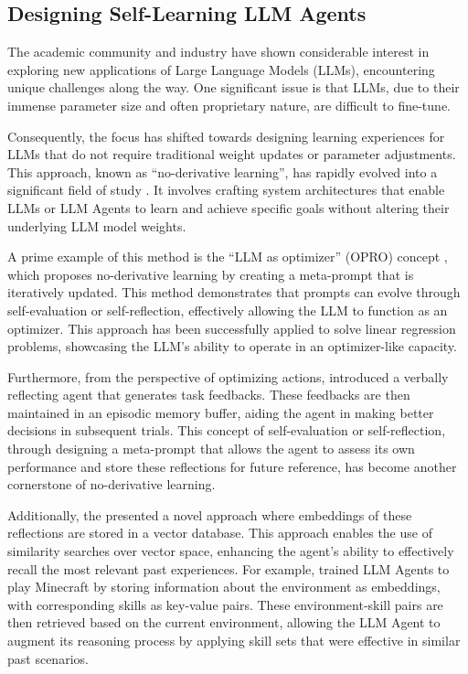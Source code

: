 \documentclass[15pt,letterpaper]{article}
\begin{document}
\subsection{Designing Self-Learning LLM Agents}\label{llm-agent-lit}

The academic community and industry have shown considerable interest 
in exploring new applications of Large Language Models (LLMs), 
encountering unique challenges along the way. 
One significant issue is that LLMs, due to their immense parameter size 
and often proprietary nature, are difficult to fine-tune. 

Consequently, the focus has shifted towards designing learning experiences 
for LLMs that do not require traditional weight updates or parameter adjustments. 
This approach, known as ``no-derivative learning'', 
has rapidly evolved into a significant field of study \citep{yang2023large, zhu2023ghost, wang2023voyager}. 
It involves crafting system architectures that enable LLMs or LLM Agents to learn and achieve specific goals without altering their underlying LLM model weights.

A prime example of this method is the ``LLM as optimizer'' (OPRO) concept \citep{yang2023large}, which proposes no-derivative learning by creating a meta-prompt that is iteratively updated.
This method demonstrates that prompts can evolve through self-evaluation or self-reflection, effectively allowing the LLM to function as an optimizer. This approach has been successfully applied to solve linear regression problems, showcasing the LLM's ability to operate in an optimizer-like capacity.

Furthermore, from the perspective of optimizing actions, \cite{shinn2023reflexion} introduced a verbally reflecting agent that generates task feedbacks. These feedbacks are then maintained in an episodic memory buffer, aiding the agent in making better decisions in subsequent trials. This concept of self-evaluation or self-reflection, through designing a meta-prompt that allows the agent to assess its own performance and store these reflections for future reference, has become another cornerstone of no-derivative learning.

Additionally, the \cite{wang2023voyager} presented a novel approach where embeddings of these reflections are stored in a vector database. 
This approach enables the use of similarity searches over vector space, enhancing the agent's ability to effectively recall the most relevant past experiences. For example, \cite{wang2023voyager} trained LLM Agents to play Minecraft by storing information about the environment as embeddings, with corresponding skills as key-value pairs. These environment-skill pairs are then retrieved based on the current environment, allowing the LLM Agent to augment its reasoning process by applying skill sets that were effective in similar past scenarios.
\end{document}
